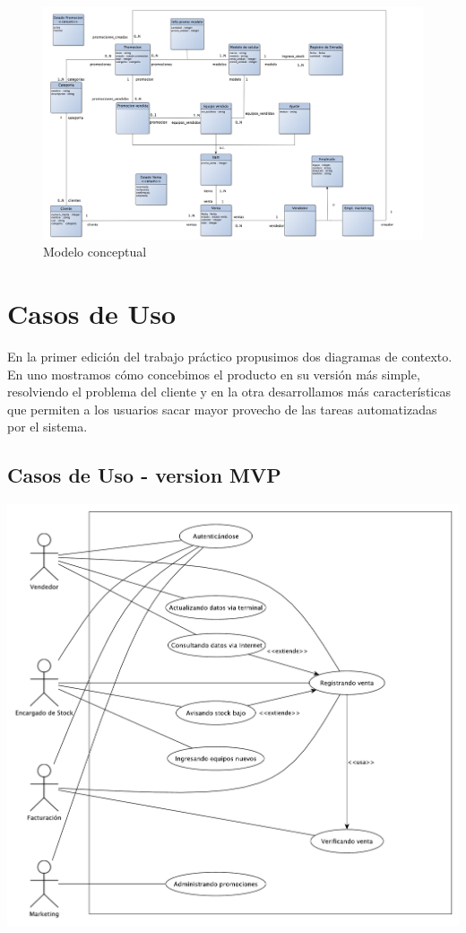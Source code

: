 \clearpage

\begin{figure}[h!]
  \centering
  \includegraphics[width=1.5\textwidth, angle=90]{./imagenes/modelo_conceptual.png}
  \caption{Modelo conceptual}
  \label{fig:modelo_conceptual}
\end{figure}

\clearpage

\section{Casos de Uso}

En la primer edición del trabajo práctico propusimos dos diagramas de contexto. En uno mostramos cómo concebimos el producto en su versión más simple, resolviendo el problema del cliente y en la otra desarrollamos más características que permiten a los usuarios sacar mayor provecho de las tareas automatizadas por el sistema.

\subsection{Casos de Uso - version MVP}

\includegraphics[width=1\textwidth]{./imagenes/casos_de_uso_mvp.pdf}

